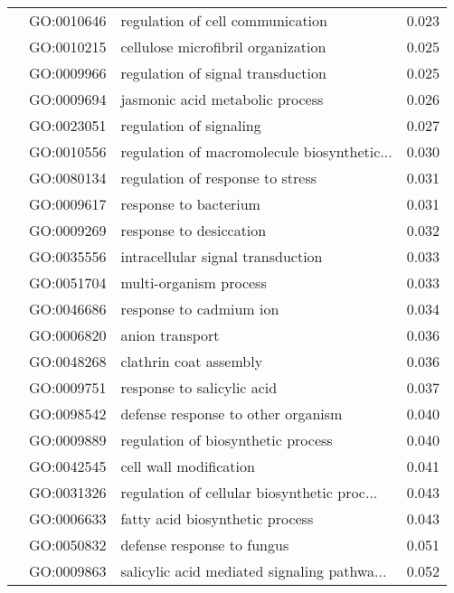 \begin{longtable}{lllr}
   & GO:0010646 &             regulation of cell communication &         0.023 \\
   & GO:0010215 &           cellulose microfibril organization &         0.025 \\
   & GO:0009966 &            regulation of signal transduction &         0.025 \\
   & GO:0009694 &              jasmonic acid metabolic process &         0.026 \\
   & GO:0023051 &                      regulation of signaling &         0.027 \\
   & GO:0010556 &  regulation of macromolecule biosynthetic... &         0.030 \\
   & GO:0080134 &             regulation of response to stress &         0.031 \\
   & GO:0009617 &                        response to bacterium &         0.031 \\
   & GO:0009269 &                      response to desiccation &         0.032 \\
   & GO:0035556 &            intracellular signal transduction &         0.033 \\
   & GO:0051704 &                       multi-organism process &         0.033 \\
   & GO:0046686 &                      response to cadmium ion &         0.034 \\
   & GO:0006820 &                              anion transport &         0.036 \\
   & GO:0048268 &                       clathrin coat assembly &         0.036 \\
   & GO:0009751 &                   response to salicylic acid &         0.037 \\
   & GO:0098542 &           defense response to other organism &         0.040 \\
   & GO:0009889 &           regulation of biosynthetic process &         0.040 \\
   & GO:0042545 &                       cell wall modification &         0.041 \\
   & GO:0031326 &  regulation of cellular biosynthetic proc... &         0.043 \\
   & GO:0006633 &              fatty acid biosynthetic process &         0.043 \\
   & GO:0050832 &                   defense response to fungus &         0.051 \\
   & GO:0009863 &  salicylic acid mediated signaling pathwa... &         0.052 \\

\end{longtable}
